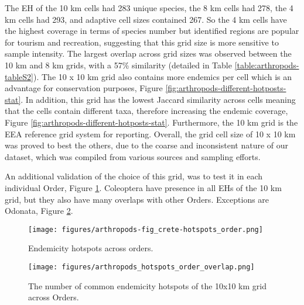 The EH of the 10 km cells had 283 unique species,
the 8 km cells had 278, the 4 km cells had 293, and adaptive cell sizes contained 267.
So the 4 km cells have the highest coverage in terms of species number but identified regions
are popular for tourism and recreation, suggesting that this grid size is more
sensitive to sample intensity. 
The largest overlap across grid sizes was observed between the 10 km and 8 km grids, with a
57\% similarity (detailed in Table \ref{table:arthropods-tableS2}).
The 10 x 10 km grid also contains more endemics per cell which is 
an advantage for conservation purposes, Figure \ref{fig:arthropods-different-hotposts-stat}.
In addition, this grid has the lowest Jaccard similarity across cells 
meaning that the cells contain different taxa, therefore increasing 
the endemic coverage, Figure \ref{fig:arthropods-different-hotposts-stat}.
Furthermore, the 10 km grid is the EEA reference grid system for reporting.
Overall, the grid cell size of 10 x 10 km was proved to best the others, due to the
coarse and inconsistent nature of our dataset, which was compiled from various
sources and sampling efforts.

An additional validation of the choice of this grid, was to test it in each 
individual Order, Figure \ref{fig:arthropods-hotspots-order}. Coleoptera 
have presence in all EHs of the 10 km grid, but they also have many overlaps 
with other Orders. Exceptions are Odonata, Figure \ref{fig:arthropods-hotspots-orders-overlap}. 

   \begin{figure}[htb!]
      \centering
      \texttt{[image: figures/arthropods-fig\_crete-hotspots\_order.png]}
      \caption[Hotspots of every order]{Endemicity hotspots across orders.}
      \label{fig:arthropods-hotspots-order}
   \end{figure}
   
   \begin{figure}[htb!]
      \centering
      \texttt{[image: figures/arthropods\_hotspots\_order\_overlap.png]}
      \caption[Hotspots overlaps across Orders]{The number of common endemicity hotspots of the 10x10 km grid across Orders.}
      \label{fig:arthropods-hotspots-orders-overlap}
   \end{figure}

